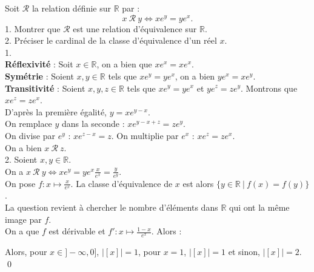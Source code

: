 \documentclass[10pt]{article}
\begin{document}
\begin{tcolorbox}[enhanced, width=7.6in, center, size=fbox, fontupper=\large, drop shadow southwest]
    Soit $\mathcal{R}$ la relation définie sur $\mathbb{R}$ par :
    \begin{equation*}
        x ~\mathcal{R} ~ y \iff xe^y = ye^x.
    \end{equation*}
    1. Montrer que $\mathcal{R}$ est une relation d'équivalence sur $\mathbb{R}$.\\
    2. Préciser le cardinal de la classe d'équivalence d'un réel $x$.\\[0.1cm]
    1.\\
    \textbf{Réflexivité} : Soit $x\in\mathbb{R}$, on a bien que $xe^x = xe^x$.\\
    \textbf{Symétrie} : Soient $x,y\in\mathbb{R}$ tels que $xe^y = ye^x$, on a bien $ye^x = xe^y$.\\
    \textbf{Transitivité} : Soient $x,y,z\in\mathbb{R}$ tels que $xe^y = ye^x$ et $ye^z = ze^y$. Montrons que $xe^z = ze^x$.\\
    D'après la première égalité, $y=xe^{y-x}$.\\
    On remplace $y$ dans la seconde : $xe^{y-x+z}=ze^y$.\\
    On divise par $e^y$ : $xe^{z-x}=z$. On multiplie par $e^x$ : $xe^z = ze^x$.\\
    On a bien $x ~ \mathcal{R} ~ z$.\\[0.2cm]
    2. Soient $x,y\in\mathbb{R}$.\\
    On a $x ~ \mathcal{R} ~ y \iff xe^y = ye^x \frac{x}{e^x} = \frac{y}{e^y}$.\\
    On pose $f:x\mapsto \frac{x}{e^x}$. La classe d'équivalence de $x$ est alors $\{y\in\mathbb{R} ~ | ~ f(x) = f(y)\}$.\\
    La question revient à chercher le nombre d'éléments dans $\mathbb{R}$ qui ont la même image par $f$.\\
    On a que $f$ est dérivable et $f':x\mapsto \frac{1-x}{e^{x}}$. Alors :
    \begin{center}
    \end{center}
    Alors, pour $x\in]-\infty,0]$, $|[x]|=1$, pour $x=1$, $|[x]|=1$ et sinon, $|[x]|=2$.\\
    \qed
\end{tcolorbox}
\end{document}
